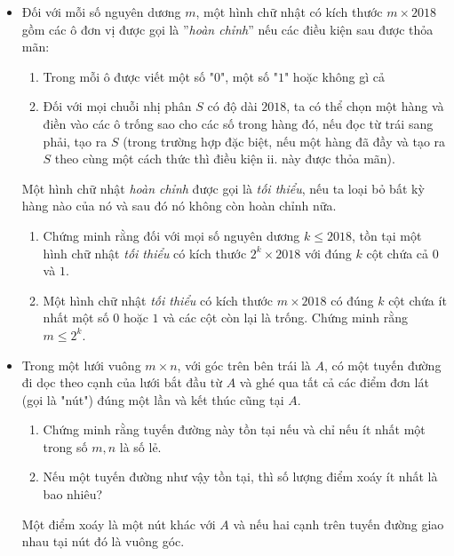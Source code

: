 \documentclass[11pt]{scrartcl}
\begin{document}
\begin{itemize}[label=, leftmargin=0em, itemsep=0.5em]
   
    \item \begin{btvn}
        Đối với mỗi số nguyên dương $m$, một hình chữ nhật có kích thước $m\times 2018$ gồm các ô đơn vị được gọi là ''\textit{hoàn chỉnh}'' nếu các điều kiện sau được thỏa mãn:
        \begin{enumerate}
            \item Trong mỗi ô được viết một số "$0$", một số "$1$" hoặc không gì cả
            \item Đối với mọi chuỗi nhị phân $S$ có độ dài $2018$, ta có thể chọn một hàng và điền vào các ô trống sao cho các số trong hàng đó, nếu đọc từ trái sang phải, tạo ra $S$ (trong trường hợp đặc biệt, nếu một hàng đã đầy và tạo ra $S$ theo cùng một cách thức thì điều kiện ii. này được thỏa mãn).
        \end{enumerate}
        Một hình chữ nhật \textit{hoàn chỉnh} được gọi là \textit{tối thiểu}, nếu ta loại bỏ bất kỳ hàng nào của nó và sau đó nó không còn hoàn chỉnh nữa.
        \begin{enumerate}[label=(\alph*)]
        \item Chứng minh rằng đối với mọi số nguyên dương $k\le 2018$, tồn tại một hình chữ nhật \textit{tối thiểu} có kích thước $2^k\times 2018$ với đúng $k$ cột chứa cả $0$ và $1$.
        \item Một hình chữ nhật \textit{tối thiểu} có kích thước $m\times 2018$ có đúng $k$ cột chứa ít nhất một số $0$ hoặc $1$ và các cột còn lại là trống. Chứng minh rằng $m\le 2^k$.
        \end{enumerate}
    \end{btvn}

    \item \begin{btvn} Trong một lưới vuông $m\times n$, với góc trên bên trái là $A$, có một tuyến đường đi dọc theo cạnh của lưới bắt đầu từ $A$ và ghé qua tất cả các điểm đơn lát (gọi là "nút") đúng một lần và kết thúc cũng tại $A$.
        \begin{enumerate}[label=(\alph*)]
            \item Chứng minh rằng tuyến đường này tồn tại nếu và chỉ nếu ít nhất một trong số $m, n$ là số lẻ.
            \item Nếu một tuyến đường như vậy tồn tại, thì số lượng điểm xoáy ít nhất là bao nhiêu?    
        \end{enumerate}
Một điểm xoáy là một nút khác với $A$ và nếu hai cạnh trên tuyến đường giao nhau tại nút đó là vuông góc.
    \end{btvn}


\end{itemize}
\end{document}
